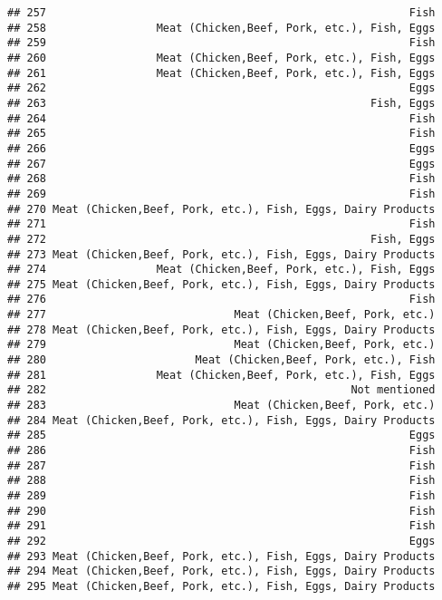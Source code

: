 \documentclass[
]{article}
\begin{document}
\begin{verbatim}
## 257                                                        Fish
## 258                 Meat (Chicken,Beef, Pork, etc.), Fish, Eggs
## 259                                                        Fish
## 260                 Meat (Chicken,Beef, Pork, etc.), Fish, Eggs
## 261                 Meat (Chicken,Beef, Pork, etc.), Fish, Eggs
## 262                                                        Eggs
## 263                                                  Fish, Eggs
## 264                                                        Fish
## 265                                                        Fish
## 266                                                        Eggs
## 267                                                        Eggs
## 268                                                        Fish
## 269                                                        Fish
## 270 Meat (Chicken,Beef, Pork, etc.), Fish, Eggs, Dairy Products
## 271                                                        Fish
## 272                                                  Fish, Eggs
## 273 Meat (Chicken,Beef, Pork, etc.), Fish, Eggs, Dairy Products
## 274                 Meat (Chicken,Beef, Pork, etc.), Fish, Eggs
## 275 Meat (Chicken,Beef, Pork, etc.), Fish, Eggs, Dairy Products
## 276                                                        Fish
## 277                             Meat (Chicken,Beef, Pork, etc.)
## 278 Meat (Chicken,Beef, Pork, etc.), Fish, Eggs, Dairy Products
## 279                             Meat (Chicken,Beef, Pork, etc.)
## 280                       Meat (Chicken,Beef, Pork, etc.), Fish
## 281                 Meat (Chicken,Beef, Pork, etc.), Fish, Eggs
## 282                                               Not mentioned
## 283                             Meat (Chicken,Beef, Pork, etc.)
## 284 Meat (Chicken,Beef, Pork, etc.), Fish, Eggs, Dairy Products
## 285                                                        Eggs
## 286                                                        Fish
## 287                                                        Fish
## 288                                                        Fish
## 289                                                        Fish
## 290                                                        Fish
## 291                                                        Fish
## 292                                                        Eggs
## 293 Meat (Chicken,Beef, Pork, etc.), Fish, Eggs, Dairy Products
## 294 Meat (Chicken,Beef, Pork, etc.), Fish, Eggs, Dairy Products
## 295 Meat (Chicken,Beef, Pork, etc.), Fish, Eggs, Dairy Products

\end{verbatim}
\end{document}
